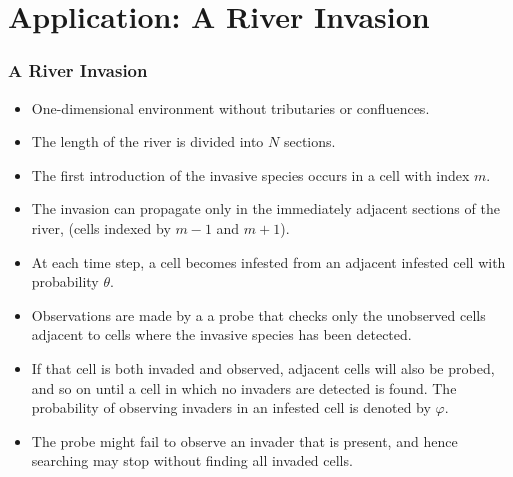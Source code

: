 \documentclass[9pt, xcolor={dvipsnames,svgnames,table}]{beamer}
\begin{document}
\section{Application: A River Invasion}

\begin{frame}
\frametitle{A River Invasion}
    \begin{itemize}
        \item One-dimensional environment without tributaries or confluences. 
        \item The length of the river is divided into \textcolor{PineGreen}{$N$ sections}.
        \item The first introduction of the invasive species occurs in a cell with index $m$.
        \item The invasion can propagate only in the immediately adjacent sections of the river, (cells indexed by $m-1$ and $m+1$).
        \item At each time step, \textcolor{PineGreen}{a cell becomes infested} from an adjacent infested cell \textcolor{PineGreen}{with probability $\theta$}.
        \item Observations are made by a a probe that checks only the unobserved cells adjacent to cells where the invasive species has been detected.
        \item If that cell is both invaded and observed, adjacent cells will also be probed, and so on until a cell in which no invaders are detected is found.  The \textcolor{PineGreen}{probability of observing} invaders in an infested cell \textcolor{PineGreen}{is denoted by $\varphi$}.
        \item The probe might fail to observe an invader that is present, and hence searching may stop without finding all invaded cells.
    \end{itemize}
\end{frame}
\end{document}
